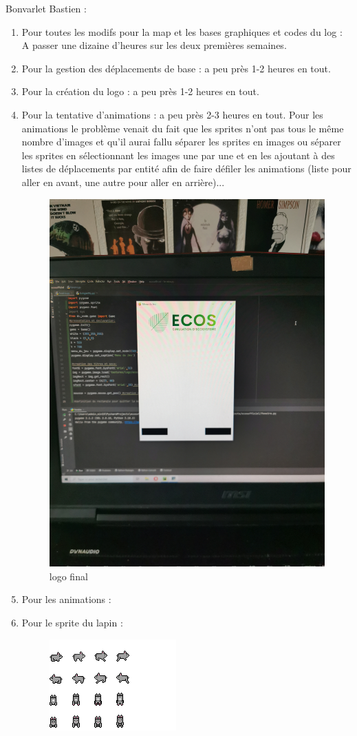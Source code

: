 \documentclass[a4paper, 11pt]{article}
\begin{document}
Bonvarlet Bastien :\\
\begin{enumerate}
\item Pour toutes les modifs pour la map et les bases graphiques et codes du log : A passer une dizaine d'heures sur les deux premières semaines.\\
\item Pour la gestion des déplacements de base : a peu près 1-2 heures en tout.\\
\item Pour la création du logo : a peu près 1-2 heures en tout.\\
\item Pour la tentative d'animations : a peu près 2-3 heures en tout. Pour les animations le problème venait du fait que les sprites n'ont pas tous le même nombre d'images et qu'il aurai fallu séparer les sprites en images ou séparer les sprites en sélectionnant les images une par une et en les ajoutant à des listes de déplacements par entité afin de faire défiler les animations (liste pour aller en avant, une autre pour aller en arrière)...\\
\begin{figure}[ht!]
 \centering
 \includegraphics[width=0.5\linewidth]{images/creation_logo.jpg}
 \caption{logo final}
 \label{fig::example::one}
\end{figure}
\item Pour les animations : \\
\item Pour le sprite du lapin :\\
\begin{figure}[ht!]
 \centering
 \includegraphics[width=0.75\linewidth]{images/rabbit.png}

\end{figure}
\end{enumerate}
\end{document}
